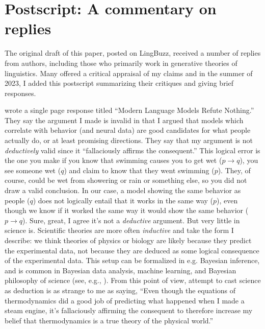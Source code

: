 \documentclass[output=paper,colorlinks,citecolor=brown
]{langscibook}
\begin{document}
\section*{Postscript: A commentary on replies}

The original draft of this paper, posted on LingBuzz, received a number of replies from authors, including those who primarily work in generative theories of linguistics. Many offered a critical appraisal of my claims and in the summer of 2023, I added this postscript  summarizing their critiques and giving brief responses.

\citet{rawski2023modern} wrote a single page response titled ``Modern Language Models Refute Nothing.'' They say the argument I made is invalid in that I argued that models which correlate with behavior (and neural data) are good candidates for what people actually do, or at least promising directions. They say that my argument is not \textit{deductively} valid since it ``fallaciously affirms the consequent.'' This logical error is the one you make if you know that swimming causes you to get wet ($p \to q$), you see someone wet ($q$) and claim to know that they went swimming ($p$). They, of course, could be wet from showering or rain or something else, so you did not draw a valid conclusion. In our case, a model showing the same behavior as people ($q$) does not logically entail that it works in the same way ($p$), even though we know if it worked the same way it would show the same behavior ($p \to q$). Sure, great, I agree it's not a \textit{deductive} argument. But very little in science is. Scientific theories are more often \textit{inductive} and take the form I describe: we think theories of physics or biology are likely because they predict the experimental data, not because they are deduced as some logical consequence of the experimental data. This setup can be formalized in e.g. Bayesian inference, and is common in Bayesian data analysis, machine learning, and Bayesian philosophy of science (see, e.g., \citealt{jeffreys1998theory,godfrey2009theory}). From this point of view,  attempt to cast science as deduction is as strange to me as saying, ``Even though the equations of thermodynamics did a good job of predicting what happened when I made a steam engine, it's fallaciously affirming the consequent to therefore increase my belief that thermodynamics is a true theory of the physical world.'' 
\end{document}

